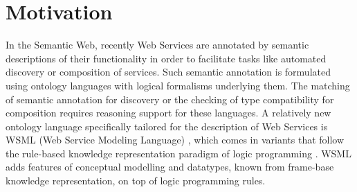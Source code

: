\section{Motivation\label{sec:motivation}}

In the Semantic Web, recently Web Services are annotated by
semantic descriptions of their functionality in order to
facilitate tasks like automated discovery or composition of
services. Such semantic annotation is formulated using ontology
languages with logical formalisms underlying them. The matching of
semantic annotation for discovery or the checking of type
compatibility for composition requires reasoning support for these
languages. A relatively new ontology language specifically
tailored for the description of Web Services is WSML (Web Service
Modeling Language) \cite{wsml}, which comes in variants that
follow the rule-based knowledge representation paradigm of logic
programming \cite{lloyd-FoundationsOfLP}. WSML adds features of
conceptual modelling and datatypes, known from frame-base
knowledge representation, on top of logic programming rules.

